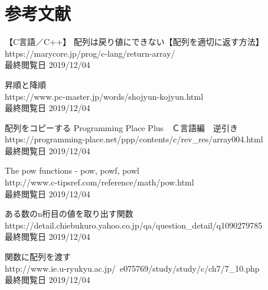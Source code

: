 

\section{参考文献}
【C言語／C++】 配列は戻り値にできない【配列を適切に返す方法】 \\
https://marycore.jp/prog/c-lang/return-array/ \\
最終閲覧日 2019/12/04

昇順と降順 \\
https://www.pc-master.jp/words/shojyun-kojyun.html \\
最終閲覧日 2019/12/04

配列をコピーする Programming Place Plus　Ｃ言語編　逆引き \\
https://programming-place.net/ppp/contents/c/rev\_res/array004.html \\
最終閲覧日 2019/12/04

The pow functions - pow, powf, powl \\
http://www.c-tipsref.com/reference/math/pow.html \\
最終閲覧日 2019/12/04

ある数のn桁目の値を取り出す関数 \\
https://detail.chiebukuro.yahoo.co.jp/qa/question\_detail/q1090279785 \\
最終閲覧日 2019/12/04

関数に配列を渡す \\
http://www.ie.u-ryukyu.ac.jp/~e075769/study/study/c/ch7/7\_10.php \\
最終閲覧日 2019/12/04

